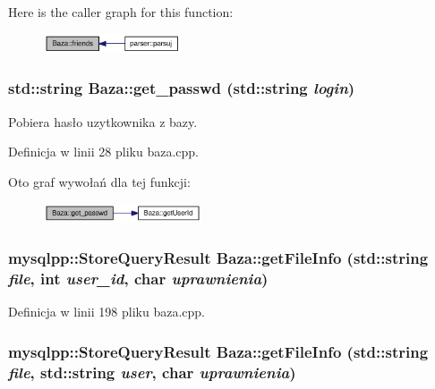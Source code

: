 Here is the caller graph for this function:\nopagebreak
\begin{figure}[H]
\begin{center}
\leavevmode
\includegraphics[width=115pt]{d8/d84/a00001_170c8dad434281805524834ace0a3109_icgraph}
\end{center}
\end{figure}
\hypertarget{a00001_a09b37e4665bd7b2f2b8b54f8120f5be}{
\subsubsection[{get\_\-passwd}]{\setlength{\rightskip}{0pt plus 5cm}std::string Baza::get\_\-passwd (std::string {\em login})}}
\label{d8/d84/a00001_a09b37e4665bd7b2f2b8b54f8120f5be}


Pobiera hasło uzytkownika z bazy. 



Definicja w linii 28 pliku baza.cpp.

Oto graf wywołań dla tej funkcji:\nopagebreak
\begin{figure}[H]
\begin{center}
\leavevmode
\includegraphics[width=132pt]{d8/d84/a00001_a09b37e4665bd7b2f2b8b54f8120f5be_cgraph}
\end{center}
\end{figure}
\hypertarget{a00001_77b0a90456f585f9b21e7b42c9869047}{
\subsubsection[{getFileInfo}]{\setlength{\rightskip}{0pt plus 5cm}mysqlpp::StoreQueryResult Baza::getFileInfo (std::string {\em file}, \/  int {\em user\_\-id}, \/  char {\em uprawnienia})}}
\label{d8/d84/a00001_77b0a90456f585f9b21e7b42c9869047}




Definicja w linii 198 pliku baza.cpp.\hypertarget{a00001_bc2479ccfcd28a0d2f7f303d202abfde}{
\subsubsection[{getFileInfo}]{\setlength{\rightskip}{0pt plus 5cm}mysqlpp::StoreQueryResult Baza::getFileInfo (std::string {\em file}, \/  std::string {\em user}, \/  char {\em uprawnienia})}}
\label{d8/d84/a00001_bc2479ccfcd28a0d2f7f303d202abfde}



